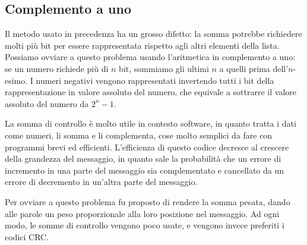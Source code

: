     \subsection{Complemento a uno}
        Il metodo usato in precedenza ha un grosso difetto: la somma potrebbe richiedere molti più bit per essere rappresentata rispetto agli altri elementi della lista. Possiamo ovviare a questo problema usando l'aritmetica in complemento a uno: se un numero richiede più di $n$ bit, sommiamo gli ultimi $n$ a quelli prima dell'$n$-esimo. I numeri negativi vengono rappresentati invertendo tutti i bit della rappresentazione in valore assoluto del numero, che equivale a sottrarre il valore assoluto del numero da $2^n - 1$.
        
        La somma di controllo è molto utile in contesto software, in quanto tratta i dati come numeri, li somma e li complementa, cose molto semplici da fare con programmi brevi ed efficienti. L'efficienza di questo codice decresce al crescere della grandezza del messaggio, in quanto sale la probabilità che un errore di incremento in una parte del messaggio sia complementato e cancellato da un errore di decremento in un'altra parte del messaggio.
        
        Per ovviare a questo problema fu proposto di rendere la somma pesata, dando alle parole un peso proporzionale alla loro posizione nel messaggio. Ad ogni modo, le somme di controllo vengono poco usate, e vengono invece preferiti i codici CRC.